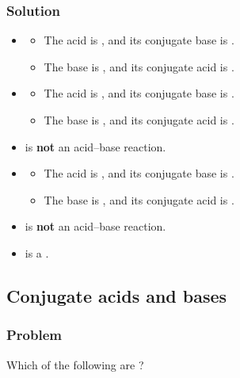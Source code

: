 \documentclass[12pt, a4paper, twoside]{pancake-book}
\begin{document}
\subsubsection{Solution}
\begin{itemize}
	\item {\color{accent} }
	      \begin{itemize}
		      \item The acid is , and its conjugate base is .
		      \item The base is , and its conjugate acid is .
	      \end{itemize}
	\item {\color{accent} }
	      \begin{itemize}
		      \item The acid is , and its conjugate base is .
		      \item The base is , and its conjugate acid is .
	      \end{itemize}
	\item {} is \textbf{not} an acid--base reaction.
	\item {\color{accent} }
	      \begin{itemize}
		      \item The acid is , and its conjugate base is .
		      \item The base is , and its conjugate acid is .
	      \end{itemize}
	\item {} is \textbf{not} an acid--base reaction.
	\item {\color{black!40!white} } is a .
\end{itemize}

\subsection{Conjugate acids and bases}

\subsubsection{Problem}
Which of the following are
?
\end{document}
